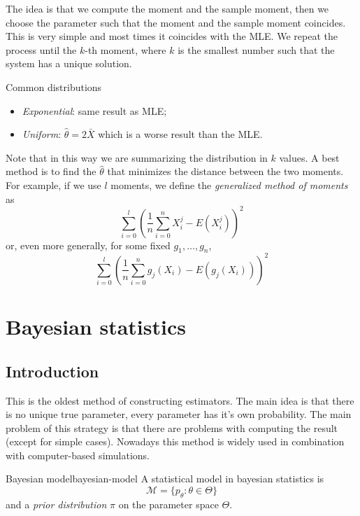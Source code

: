 \documentclass[12pt]{extarticle}
\begin{document}
The idea is that we compute the moment and the sample moment, then we choose the parameter such that the moment and the sample moment coincides.
This is very simple and most times it coincides with the MLE.
We repeat the process until the $k$-th moment, where $k$ is the smallest number such that the system has a unique solution.

\begin{example}{Common distributions}{}
    \begin{itemize}
        \item \emph{Exponential}: same result as MLE;
        \item \emph{Uniform}: $\hat \theta = 2 \bar X$ which is a worse result than the MLE.
    \end{itemize}
\end{example}

Note that in this way we are summarizing the distribution in $k$ values. A best method is to find the $\hat \theta$ that minimizes the distance between the two moments.
For example, if we use $l$ moments, we define the \emph{generalized method of moments} as
\begin{equation}
    \sum_{i = 0}^l \left( \frac{1}{n} \sum_{i = 0}^n X^j_i - E(X_i^j) \right)^2
\end{equation}
or, even more generally, for some fixed $g_1, \dots, g_n$,
\begin{equation}
    \sum_{i = 0}^l \left( \frac{1}{n} \sum_{i = 0}^n g_j(X_i) - E(g_j(X_i)) \right)^2
\end{equation}

\section{Bayesian statistics}

\label{sec:bayes}

\subsection{Introduction}

This is the oldest method of constructing estimators.
The main idea is that there is no unique true parameter, every parameter has it's own probability.
The main problem of this strategy is that there are problems with computing the result (except for simple cases).
Nowadays this method is widely used in combination with computer-based simulations.

\begin{definition}{Bayesian model}{bayesian-model}
    A statistical model in bayesian statistics is
    \begin{equation}
        \mathcal M = \{ p_\theta : \theta \in \Theta \}
    \end{equation}
    and a \emph{prior distribution} $\pi$ on the parameter space $\Theta$.
\end{definition}
\end{document}
